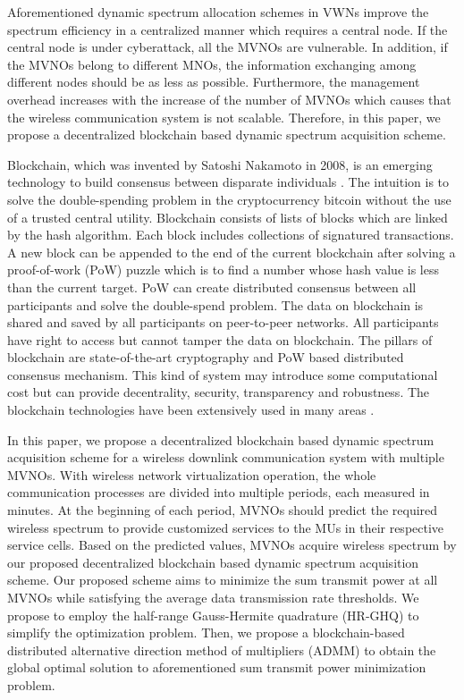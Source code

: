 \documentclass[journal]{IEEEtran}
\begin{document}
Aforementioned dynamic spectrum allocation schemes in VWNs improve the spectrum efficiency in a centralized manner which requires a central node.
If the central node is under cyberattack, all the MVNOs are vulnerable. In addition, if the MVNOs belong to different MNOs, the information exchanging among different nodes should be as less as possible. Furthermore, the management overhead increases with the increase of the number of MVNOs which causes that the wireless communication system is not scalable. Therefore, in this paper, we propose a decentralized blockchain based dynamic spectrum acquisition scheme.

Blockchain, which was invented by Satoshi Nakamoto in 2008, is an emerging technology to build consensus between disparate individuals \cite{SNakamoto}. The intuition is to solve the double-spending problem in the cryptocurrency bitcoin without the use of a trusted central utility. Blockchain consists of lists of blocks which are linked by the hash algorithm. Each block includes collections of signatured transactions. A new block can be appended to the end of the current blockchain after solving a proof-of-work (PoW) puzzle which is to find a number whose hash value is less than the current target. PoW can create distributed consensus between all participants and solve the double-spend problem. The data on blockchain is shared and saved by all participants on peer-to-peer networks. All participants have right to access but cannot tamper the data on blockchain. The pillars of blockchain are state-of-the-art cryptography and PoW based distributed consensus mechanism. This kind of system may introduce some computational cost but can provide decentrality, security, transparency and robustness. The blockchain technologies have been extensively used in many areas \cite{KGai,PKSharma,ZXiong,DBRawat,Munsing,KKotobi}.

In this paper, we propose a decentralized blockchain based dynamic spectrum acquisition scheme for a wireless downlink communication system with multiple MVNOs. With wireless network virtualization operation, the whole communication processes are divided into multiple periods, each measured in minutes. At the beginning of each period, MVNOs should predict the required wireless spectrum to provide customized services to the MUs in their respective service cells. Based on the predicted values, MVNOs acquire wireless spectrum by our proposed decentralized blockchain based dynamic spectrum acquisition scheme. Our proposed scheme aims to minimize the sum transmit power at all MVNOs while satisfying the average data transmission rate thresholds. We propose to employ the half-range Gauss-Hermite quadrature (HR-GHQ) to simplify the optimization problem. Then, we propose a blockchain-based distributed alternative direction method of multipliers (ADMM) to obtain the global optimal solution to aforementioned sum transmit power minimization problem.
\end{document}
